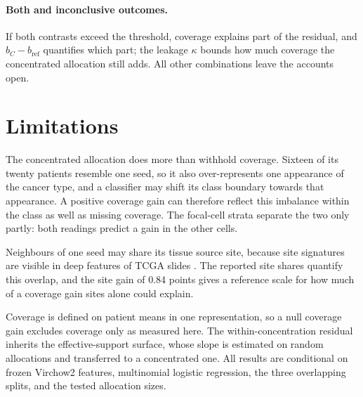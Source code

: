 \documentclass[11pt]{article}
\begin{document}
\paragraph{Both and inconclusive outcomes.}
If both contrasts exceed the threshold, coverage explains part of the residual, and $b_C-b_{\mathrm{ref}}$ quantifies which part; the leakage $\kappa$ bounds how much coverage the concentrated allocation still adds. All other combinations leave the accounts open.



\section{Limitations}
\label{sec:limitations}
The concentrated allocation does more than withhold coverage. Sixteen of its twenty patients resemble one seed, so it also over-represents one appearance of the cancer type, and a classifier may shift its class boundary towards that appearance. A positive coverage gain can therefore reflect this imbalance within the class as well as missing coverage. The focal-cell strata separate the two only partly: both readings predict a gain in the other cells.

Neighbours of one seed may share its tissue source site, because site signatures are visible in deep features of TCGA slides \citep{howard2021impact}. The reported site shares quantify this overlap, and the site gain of 0.84 points \citep{queisler2026siteCoverage} gives a reference scale for how much of a coverage gain sites alone could explain.

Coverage is defined on patient means in one representation, so a null coverage gain excludes coverage only as measured here. The within-concentration residual inherits the effective-support surface, whose slope is estimated on random allocations and transferred to a concentrated one. All results are conditional on frozen Virchow2 features, multinomial logistic regression, the three overlapping splits, and the tested allocation sizes.



\end{document}
